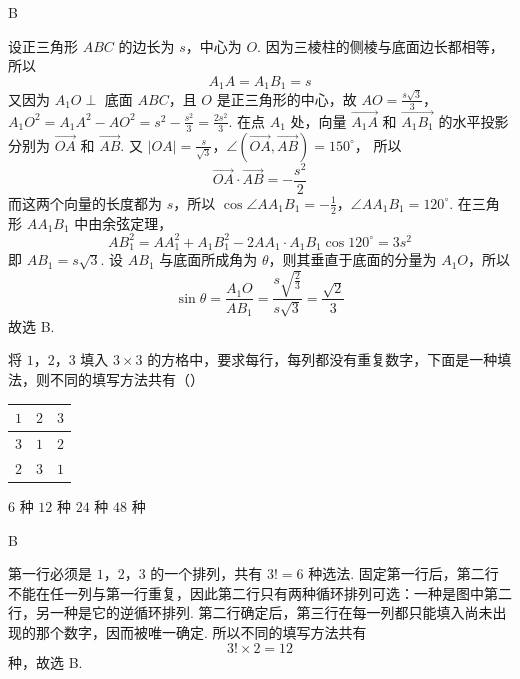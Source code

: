 \begin{answer}
B
\end{answer}

\begin{solution}
设正三角形 \(ABC\) 的边长为 \(s\)，中心为 \(O\). 因为三棱柱的侧棱与底面边长都相等，所以
\[
A_1A=A_1B_1=s
\]
又因为 \(A_1O\perp\) 底面 \(ABC\)，且 \(O\) 是正三角形的中心，故
\(AO=\frac{s\sqrt{3}}{3}\)，\(A_1O^2=A_1A^2-AO^2=s^2-\frac{s^2}{3}=\frac{2s^2}{3}\).
在点 \(A_1\) 处，向量 \(\overrightarrow{A_1A}\) 和 \(\overrightarrow{A_1B_1}\) 的水平投影分别为 \(\overrightarrow{OA}\) 和 \(\overrightarrow{AB}\). 又
\(|OA|=\frac{s}{\sqrt{3}}\)，\(\angle\left(\overrightarrow{OA},\overrightarrow{AB}\right)=150^\circ\)，
所以
\[
\overrightarrow{OA}\cdot\overrightarrow{AB}=-\frac{s^2}{2}
\]
而这两个向量的长度都为 \(s\)，所以
\(\cos\angle AA_1B_1=-\frac12\)，\(\angle AA_1B_1=120^\circ\).
在三角形 \(AA_1B_1\) 中由余弦定理，
\[
AB_1^2=AA_1^2+A_1B_1^2-2AA_1\cdot A_1B_1\cos120^\circ=3s^2
\]
即 \(AB_1=s\sqrt{3}\). 设 \(AB_1\) 与底面所成角为 \(\theta\)，则其垂直于底面的分量为 \(A_1O\)，所以
\[
\sin\theta=\frac{A_1O}{AB_1}=\frac{s\sqrt{\frac{2}{3}}}{s\sqrt{3}}=\frac{\sqrt{2}}{3}
\]
故选 B.
\end{solution}

\begin{problem}
将 \(1\)，\(2\)，\(3\) 填入 \(3 \times 3\) 的方格中，要求每行，每列都没有重复数字，下面是一种填法，则不同的填写方法共有（\quad）

\begin{center}
\begin{tabular}{|c|c|c|}
\hline
\(1\) & \(2\) & \(3\) \\
\hline
\(3\) & \(1\) & \(2\) \\
\hline
\(2\) & \(3\) & \(1\) \\
\hline
\end{tabular}
\end{center}

\choices
    {\(6\text{ 种}\)}
    {\(12\text{ 种}\)}
    {\(24\text{ 种}\)}
    {\(48\text{ 种}\)}
\end{problem}

\begin{answer}
B
\end{answer}

\begin{solution}
第一行必须是 \(1\)，\(2\)，\(3\) 的一个排列，共有 \(3!=6\) 种选法. 固定第一行后，第二行不能在任一列与第一行重复，因此第二行只有两种循环排列可选：一种是图中第二行，另一种是它的逆循环排列. 第二行确定后，第三行在每一列都只能填入尚未出现的那个数字，因而被唯一确定. 所以不同的填写方法共有
\[
3!\times2=12
\]
种，故选 B.
\end{solution}

